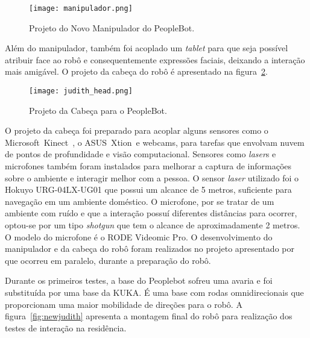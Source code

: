 \begin{figure}[ht!]
	\centering
	\begin{minipage}{0.6\textwidth}
		\caption{Projeto do Novo Manipulador do PeopleBot.}
		\texttt{[image: manipulador.png]}
		\label{fig:manipulador}
	\end{minipage}
\end{figure}

Além do manipulador, também foi acoplado um \emph{tablet} para que seja possível atribuir face ao robô e consequentemente expressões faciais, deixando a interação mais amigável. O projeto da cabeça do robô é apresentado na figura~\ref{fig:judithhead}.

\begin{figure}[ht!]
	\centering
	\begin{minipage}{0.4\textwidth}
		\caption{Projeto da Cabeça para o PeopleBot.}
		\texttt{[image: judith\_head.png]}
		\label{fig:judithhead}
	\end{minipage}
\end{figure}

O projeto da cabeça foi preparado para acoplar alguns sensores como o Microsoft\textregistered\ Kinect\textregistered\ , o ASUS\textregistered\ Xtion\textregistered\ e webcams, para tarefas que envolvam nuvem de pontos de profundidade e visão computacional. Sensores como \emph{laser}s e microfones também foram instalados para melhorar a captura de informações sobre o ambiente e interagir melhor com a pessoa. O sensor \emph{laser} utilizado foi o Hokuyo URG-04LX-UG01 que possui um alcance de 5 metros, suficiente para navegação em um ambiente doméstico. O microfone, por se tratar de um ambiente com ruído e que a interação possuí diferentes distâncias para ocorrer, optou-se por um tipo \emph{shotgun} que tem o alcance de aproximadamente 2 metros. O modelo do microfone é o RODE Videomic Pro. O desenvolvimento do manipulador e da cabeça do robô foram realizados no projeto apresentado por \textcite{gonbata:2016} que ocorreu em paralelo, durante a preparação do robô.

Durante os primeiros testes, a base do Peoplebot sofreu uma avaria e foi substituída por uma base da KUKA. É uma base com rodas omnidirecionais que proporcionam uma maior mobilidade de direções para o robô. A figura~\ref{fig:newjudith} apresenta a montagem final do robô para realização dos testes de interação na residência.


